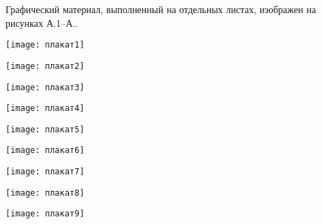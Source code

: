 
Графический материал, выполненный на отдельных листах,
изображен на рисунках А.1--А..
\setcounter{числоПлакатов}{0}
\renewcommand{\thefigure}{А.\arabic{figure}} %

\begin{landscape}
\clearpage
\begin{плакат}
    \texttt{[image: плакат1]}
    \label{pl1:image}      
\end{плакат}

\begin{плакат}
    \texttt{[image: плакат2]}
    \label{pl2:image}      
\end{плакат}

\begin{плакат}
    \texttt{[image: плакат3]}
    \label{pl3:image}      
\end{плакат}

\begin{плакат}
    \texttt{[image: плакат4]}
    \label{pl4:image}      
\end{плакат}

\begin{плакат}
    \texttt{[image: плакат5]}
    \label{pl5:image}
\end{плакат}

\begin{плакат}
    \texttt{[image: плакат6]}
    \label{pl6:image}
\end{плакат}

\begin{плакат}
    \texttt{[image: плакат7]}
    \label{pl7:image}
\end{плакат}

\begin{плакат}
    \texttt{[image: плакат8]}
    \label{pl8:image}
\end{плакат}

\begin{плакат}
    \texttt{[image: плакат9]}
    \label{pl9:image}
\end{плакат}

\end{landscape}
